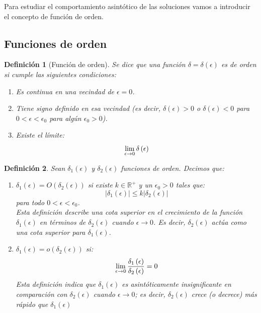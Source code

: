 \documentclass[12pt, a4paper]{report}
\newtheorem{definition}{Definición}
\begin{document}
Para estudiar el comportamiento asintótico de las soluciones vamos a introducir el concepto de función de orden.

\subsection{Funciones de orden}

\begin{definition}[Función de orden]
	Se dice que una función $\delta=\delta\left(\epsilon\right)$ es de orden si cumple las siguientes condiciones:
	\begin{enumerate}
		\item Es continua en una vecindad de $\epsilon=0$.
		\item Tiene signo definido en esa vecindad (es decir, $\delta(\epsilon)>0$ o $\delta(\epsilon)<0$ para $0<\epsilon<\epsilon_0$ para algún $\epsilon_0>0$).
		\item Existe el límite:
		$$\large\lim_{\epsilon\to0}\delta\left(\epsilon\right)$$
	\end{enumerate}
\end{definition}

\begin{definition}
	Sean $\delta_1\left(\epsilon\right)$ y $\delta_2\left(\epsilon\right)$ funciones de orden. Decimos que: 
	\begin{enumerate}
		\item $\delta_1\left(\epsilon\right)=O\left(\delta_2\left(\epsilon\right)\right)$ si existe $k\in\mathbb{R}^+$ y un $\epsilon_0>0$ tales que:
		\begin{equation}\label{eq: Big-O}
			|\delta_1\left(\epsilon\right)|\leq k|\delta_2\left(\epsilon\right)|
		\end{equation}
		para todo $0<\epsilon<\epsilon_0$.\\

		Esta definición describe una cota superior en el crecimiento de la función $\delta_1\left(\epsilon\right)$ en términos de $\delta_2\left(\epsilon\right)$ cuando $\epsilon\to0$. Es decir, $\delta_2(\epsilon)$ actúa como una cota superior para $\delta_1(\epsilon)$.\\
		\item $\delta_1\left(\epsilon\right)=o(\delta_2\left(\epsilon\right))$ si:
		\begin{equation}\label{eq: small-o}
			\large\lim_{\epsilon\to0}\frac{\delta_1\left(\epsilon\right)}{\delta_2\left(\epsilon\right)}=0
		\end{equation}
		Esta definición indica que $\delta_1\left(\epsilon\right)$ es asintóticamente insignificante en comparación con $\delta_2\left(\epsilon\right)$ cuando $\epsilon\to0$; es decir, $\delta_2(\epsilon)$ crece (o decrece) más rápido que $\delta_1(\epsilon)$\\
	\end{enumerate}
\end{definition} 
\end{document}
